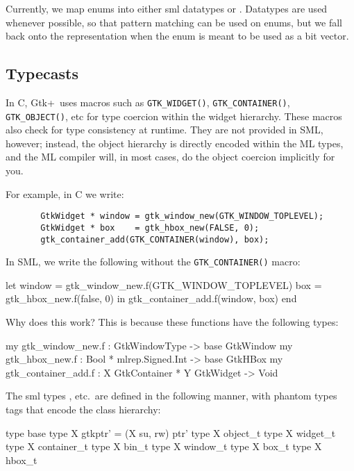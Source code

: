 \documentclass{article}
\newcommand{\gtk}{\mbox{\sf Gtk+}}
\begin{document}
    Currently, we map enums into either sml datatypes or 
.   Datatypes are used whenever possible, so that
pattern matching can be used on enums, but we fall back onto the 
 representation when the enum is meant to be used as a 
bit vector.
 
\subsection{Typecasts}
   In C, \gtk\ uses macros such as \verb|GTK_WIDGET()|, 
    \verb|GTK_CONTAINER()|, \verb|GTK_OBJECT()|,
   etc for type coercion within the widget hierarchy.  
   These macros also check for type consistency at runtime.   
   They are not provided in SML, however; instead, the object hierarchy 
   is directly encoded within the ML types, and the ML compiler will,
   in most cases, do the object coercion implicitly for you.

   For example, in C we write:
  \begin{verbatim}
       GtkWidget * window = gtk_window_new(GTK_WINDOW_TOPLEVEL);
       GtkWidget * box    = gtk_hbox_new(FALSE, 0);
       gtk_container_add(GTK_CONTAINER(window), box);
  \end{verbatim}

   In SML, we write the following without the \verb|GTK_CONTAINER()| macro:

  \begin{smldisp}
       let 
           window = gtk_window_new.f(GTK_WINDOW_TOPLEVEL)
           box    = gtk_hbox_new.f(false, 0)
       in  
           gtk_container_add.f(window, box)
       end
  \end{smldisp}

   Why does this work?  This is because these functions have the following
   types:

   \begin{smldisp}
       my gtk_window_new.f    : GtkWindowType -> base GtkWindow
       my gtk_hbox_new.f      : Bool * mlrep.Signed.Int -> base GtkHBox
       my gtk_container_add.f : X GtkContainer * Y GtkWidget -> Void
   \end{smldisp}

   The sml types ,  etc.~are 
defined in the following manner, with phantom types tags that
encode the class hierarchy:

    \begin{smldisp}
       type base
       type X gtkptr' = (X su, rw) ptr'
       type X object_t
       type X widget_t
       type X container_t
       type X bin_t
       type X window_t
       type X box_t
       type X hbox_t
    \end{smldisp}
\end{document}
